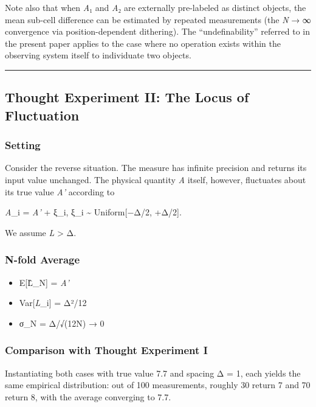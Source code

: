 \documentclass[
  11pt,
]{article}
\providecommand{\tightlist}{%
  \setlength{\itemsep}{0pt}\setlength{\parskip}{0pt}}
\begin{document}
Note also that when \emph{A}₁ and \emph{A}₂ are externally pre-labeled
as distinct objects, the mean sub-cell difference can be estimated by
repeated measurements (the \emph{N} → ∞ convergence via
position-dependent dithering). The ``undefinability'' referred to in the
present paper applies to the case where no operation exists within the
observing system itself to individuate two objects.

\begin{center}\rule{0.5\linewidth}{0.5pt}\end{center}

\subsection{Thought Experiment II: The Locus of
Fluctuation}\label{thought-experiment-ii-the-locus-of-fluctuation}

\subsubsection{Setting}\label{setting-1}

Consider the reverse situation. The measure has infinite precision and
returns its input value unchanged. The physical quantity \emph{A}
itself, however, fluctuates about its true value \emph{A'} according to

\emph{A}\_i = \emph{A'} + ξ\_i, ξ\_i \textasciitilde{} Uniform{[}−Δ/2,
+Δ/2{]}.

We assume \emph{L} \textgreater{} Δ.

\subsubsection{N-fold Average}\label{n-fold-average}

\begin{itemize}
\tightlist
\item
  E{[}L̂\_N{]} = \emph{A'}
\item
  Var{[}\emph{L}\_i{]} = Δ²/12
\item
  σ\_N = Δ/√(12N) → 0
\end{itemize}

\subsubsection{Comparison with Thought Experiment
I}\label{comparison-with-thought-experiment-i}

Instantiating both cases with true value 7.7 and spacing Δ = 1, each
yields the same empirical distribution: out of 100 measurements, roughly
30 return 7 and 70 return 8, with the average converging to 7.7.
\end{document}
